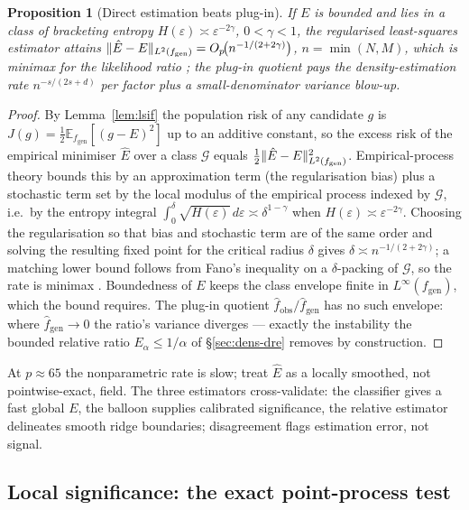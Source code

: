 \documentclass[11pt]{article}
\theoremstyle{oldplain}
\newtheorem{proposition}{Proposition}
\theoremstyle{oldrem}
\newcommand{\E}{\mathds{E}}
\DeclarePairedDelimiter{\norm}{\lVert}{\rVert}
\begin{document}
\begin{proposition}[Direct estimation beats plug-in]\label{prop:drerate}
If $E$ is bounded and lies in a class of bracketing entropy $H(\varepsilon)\asymp\varepsilon^{-2\gamma}$,
$0<\gamma<1$, the regularised least-squares estimator attains
$\norm{\hat E-E}_{L^2(f_{\mathrm{gen}})}=O_p\!\big(n^{-1/(2+2\gamma)}\big)$, $n=\min(N,M)$, which is minimax
for the likelihood ratio \cite{Nguyen2010}; the plug-in quotient pays the density-estimation rate
$n^{-s/(2s+d)}$ per factor plus a small-denominator variance blow-up.
\end{proposition}
\begin{proof}
By Lemma~\ref{lem:lsif} the population risk of any candidate $g$ is
$J(g)=\tfrac12\E_{f_{\mathrm{gen}}}[(g-E)^2]$ up to an additive constant, so the excess risk of the empirical
minimiser $\hat E$ over a class $\mathcal G$ equals $\tfrac12\norm{\hat E-E}_{L^2(f_{\mathrm{gen}})}^2$.
Empirical-process theory bounds this by an approximation term (the regularisation bias) plus a stochastic
term set by the local modulus of the empirical process indexed by $\mathcal G$, i.e.\ by the entropy integral
$\int_0^\delta\!\sqrt{H(\varepsilon)}\,d\varepsilon\asymp\delta^{1-\gamma}$ when
$H(\varepsilon)\asymp\varepsilon^{-2\gamma}$. Choosing the regularisation so that bias and stochastic term are
of the same order and solving the resulting fixed point for the critical radius $\delta$ gives
$\delta\asymp n^{-1/(2+2\gamma)}$; a matching lower bound follows from Fano's inequality on a $\delta$-packing
of $\mathcal G$, so the rate is minimax \cite{Nguyen2010}. Boundedness of $E$ keeps the class envelope finite
in $L^\infty(f_{\mathrm{gen}})$, which the bound requires. The plug-in quotient
$\hat f_{\mathrm{obs}}/\hat f_{\mathrm{gen}}$ has no such envelope: where $\hat f_{\mathrm{gen}}\!\to\!0$ the
ratio's variance diverges --- exactly the instability the bounded relative ratio $E_\alpha\le1/\alpha$ of
\S\ref{sec:dens-dre} removes by construction.
\end{proof}

At $p\approx65$ the nonparametric rate is slow; treat $\hat E$ as a locally smoothed, not pointwise-exact,
field. The three estimators cross-validate: the classifier gives a fast global $E$, the balloon supplies
calibrated significance, the relative estimator delineates smooth ridge boundaries; disagreement flags
estimation error, not signal.

\subsection{Local significance: the exact point-process test}\label{sec:dens-poisson}
\end{document}
